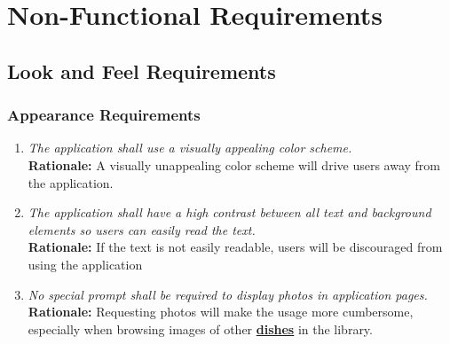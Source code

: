 \documentclass[]{article}
\begin{document}

\section{Non-Functional Requirements}
\label{sec:non-functional_requirements}

\subsection{Look and Feel Requirements}
\label{sub:look_and_feel_requirements}

\subsubsection{Appearance Requirements}
\label{ssub:appearance_requirements}
\begin{enumerate}[{LF-A}1. ]
    \item \textit{The application shall use a visually appealing color scheme.} \\ \textbf{Rationale:} A visually unappealing color scheme will drive users away from the application.
    \item \textit{The application shall have a high contrast between all text and background elements so users can easily read the text.} \\
    \textbf{Rationale:} If the text is not easily readable, users will be discouraged from using the application
    \item \textit{No special prompt shall be required to display photos in application pages.} \\ \textbf{Rationale:} Requesting photos will make the usage more cumbersome, especially when browsing images of other \hyperref[Dish]{\textbf{dishes}} in the library.
\end{enumerate}
\end{document}
